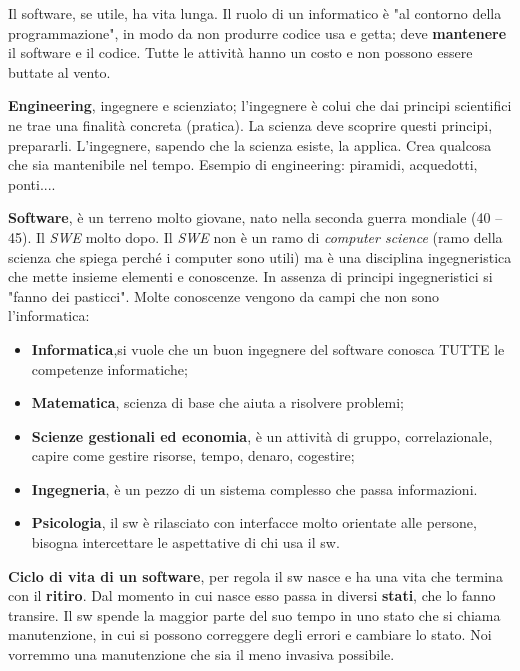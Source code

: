 






Il software, se utile, ha vita lunga.
Il ruolo di un informatico è "al contorno della programmazione", in modo da non produrre codice usa e getta; deve \textbf{mantenere} il software e il codice. Tutte le attività hanno un costo e non possono essere buttate al vento.

\textbf{Engineering}, ingegnere e scienziato; l'ingegnere è colui che dai principi scientifici ne trae una finalità concreta (pratica). La scienza deve scoprire questi principi, prepararli. L'ingegnere, sapendo che la scienza esiste, la applica. Crea qualcosa che sia mantenibile nel tempo. Esempio di engineering: piramidi, acquedotti, ponti....

\textbf{Software}, è un terreno molto giovane, nato nella seconda guerra mondiale (40 – 45). Il \textit{SWE} molto dopo. Il \textit{SWE} non è un ramo di \textit{computer science} (ramo della scienza che spiega perché i computer sono utili) ma è una disciplina ingegneristica che mette insieme elementi e conoscenze. In assenza di principi ingegneristici si "fanno dei pasticci". Molte conoscenze vengono da campi che non sono l'informatica:

\begin{itemize}

	\item \textbf{Informatica},si vuole che un buon ingegnere del software conosca TUTTE le competenze informatiche;
	\item \textbf{Matematica}, scienza di base che aiuta a risolvere problemi;
	\item \textbf{Scienze gestionali ed economia}, è un attività di gruppo, correlazionale, capire come gestire risorse, tempo, denaro, cogestire;
	\item \textbf{Ingegneria}, è un pezzo di un sistema complesso che passa informazioni.
	\item \textbf{Psicologia}, il sw è rilasciato con interfacce molto orientate alle persone, bisogna intercettare le aspettative di chi usa il sw.

\end{itemize}

\textbf{Ciclo di vita di un software}, per regola il sw nasce e ha una vita che termina con il \textbf{ritiro}. Dal momento in cui nasce esso passa in diversi \textbf{stati}, che lo fanno transire. Il sw spende la maggior parte del suo tempo in uno stato che si chiama manutenzione, in cui si possono correggere degli errori e cambiare lo stato. Noi vorremmo una manutenzione che sia il meno invasiva possibile.

